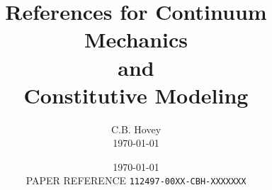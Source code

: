 \documentclass[10pt,reqno]{amsart}
\title{References for Continuum Mechanics \\ and \\ 
       Constitutive Modeling}
\author{C.B. Hovey \\ \sc\today}
\date{\today \\ PAPER REFERENCE {\tt 112497-00XX-CBH-XXXXXXX}}
\begin{document}
 
\maketitle


\nocite{
Belytschko77, 
Carini95, 
Christensen82, 
Christensen80,
Ciarlet88, 
Coleman67, 
Coleman63, 
Dafalias91,
Dong70,
Govindjee97,
Govindjee93, 
Govindjee92, 
Green68, 
Green70,
Gurtin81, 
Gurtin63,
Holzapfel96a, 
Holzapfel96b, 
Holzapfel96c, 
Holzapfel96d,
Hughes80, 
Johnson96, 
Key82, 
Kim97,
LeTallec94,
LeTallec93,
Lubliner85,
Marsden83, 
Malvern69, 
McDonald96, 
Miehe95, 
Miehe94, 
Mooney40,
Ogden84, 
Ogden72a, 
Ogden72b, 
Pinsky83,
Reese98,
Reese95, 
Rivlin48, 
Rivlin49,
Simo91,
Simo87, 
Simo85, 
Simo84, 
Sokolnikoff56,
Truesdell65}







%
\end{document}
